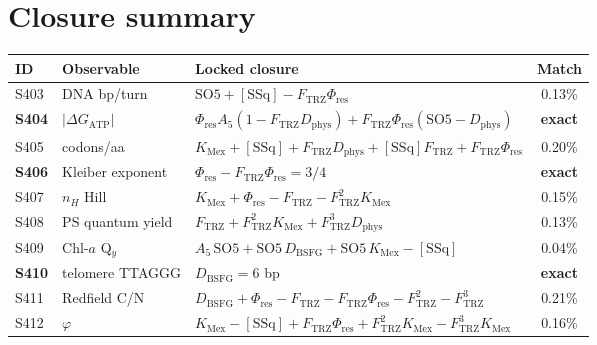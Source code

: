 \documentclass[11pt]{article}
\newcommand{\Ftrz}{F_{\mathrm{TRZ}}}
\newcommand{\Phires}{\Phi_{\mathrm{res}}}
\newcommand{\KMex}{K_{\mathrm{Mex}}}
\newcommand{\Dphys}{D_{\mathrm{phys}}}
\newcommand{\Dbsfg}{D_{\mathrm{BSFG}}}
\newcommand{\SOfive}{\mathrm{SO5}}
\newcommand{\Afive}{A_{5}}
\newcommand{\SSq}{[\mathrm{SSq}]}
\begin{document}
\section{Closure summary}
\begin{table}[h!]
\centering
\begin{tabular}{lllc}
\toprule
ID & Observable & Locked closure & Match \\
\midrule
S403 & DNA bp/turn                    & $\SOfive+\SSq-\Ftrz\Phires$                          & 0.13\% \\
\textbf{S404} & $|\Delta G_{\text{ATP}}|$   & $\Phires\Afive(1-\Ftrz\Dphys)+\Ftrz\Phires(\SOfive-\Dphys)$ & \textbf{exact} \\
S405 & codons/aa                      & $\KMex+\SSq+\Ftrz\Dphys+\SSq\Ftrz+\Ftrz\Phires$      & 0.20\% \\
\textbf{S406} & Kleiber exponent          & $\Phires-\Ftrz\Phires=3/4$                           & \textbf{exact} \\
S407 & $n_{H}$ Hill                    & $\KMex+\Phires-\Ftrz-\Ftrz^{2}\KMex$                  & 0.15\% \\
S408 & PS quantum yield                & $\Ftrz+\Ftrz^{2}\KMex+\Ftrz^{3}\Dphys$               & 0.13\% \\
S409 & Chl-$a$ Q$_y$                  & $\Afive\,\SOfive+\SOfive\,\Dbsfg+\SOfive\,\KMex-\SSq$ & 0.04\% \\
\textbf{S410} & telomere TTAGGG          & $\Dbsfg=6$ bp                                         & \textbf{exact} \\
S411 & Redfield C/N                    & $\Dbsfg+\Phires-\Ftrz-\Ftrz\Phires-\Ftrz^{2}-\Ftrz^{3}$ & 0.21\% \\
S412 & $\varphi$                       & $\KMex-\SSq+\Ftrz\Phires+\Ftrz^{2}\KMex-\Ftrz^{3}\KMex$ & 0.16\% \\
\bottomrule
\end{tabular}
\end{table}
\end{document}

